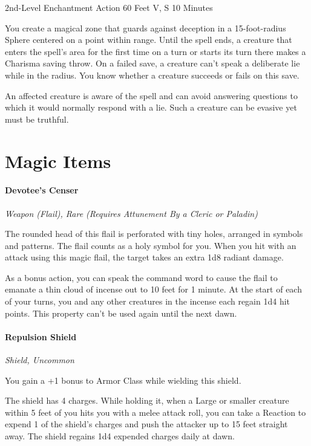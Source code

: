 \documentclass[letterpaper,openany,oneside,twocolumn]{book}
\begin{document}
	{2nd-Level Enchantment}
	{Action}
	{60 Feet}
	{V, S}
	{10 Minutes}

You create a magical zone that guards against deception in a 15-foot-radius Sphere centered on a point within range. Until the spell ends, a creature that enters the spell's area for the first time on a turn or starts its turn there makes a Charisma saving throw. On a failed save, a creature can't speak a deliberate lie while in the radius. You know whether a creature succeeds or fails on this save.

An affected creature is aware of the spell and can avoid answering questions to which it would normally respond with a lie. Such a creature can be evasive yet must be truthful.

\part*{Magic Items}
\subsection*{Devotee's Censer}
\textit{Weapon (Flail), Rare (Requires Attunement By a Cleric or Paladin)}\\
{\entryfont The rounded head of this flail is perforated with tiny holes, arranged in symbols and patterns. The flail counts as a holy symbol for you. When you hit with an attack using this magic flail, the target takes an extra 1d8 radiant damage.

As a bonus action, you can speak the command word to cause the flail to emanate a thin cloud of incense out to 10 feet for 1 minute. At the start of each of your turns, you and any other creatures in the incense each regain 1d4 hit points. This property can't be used again until the next dawn.}
\subsection*{Repulsion Shield}
\textit{Shield, Uncommon}\\
{\entryfont You gain a +1 bonus to Armor Class while wielding this shield.

The shield has 4 charges. While holding it, when a Large or smaller creature within 5 feet of you hits you with a melee attack roll, you can take a Reaction to expend 1 of the shield's charges and push the attacker up to 15 feet straight away. The shield regains 1d4 expended charges daily at dawn.}
\end{document}
